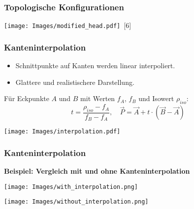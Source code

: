 \documentclass{beamer}
\begin{document}
\begin{frame}[t]
  \frametitle{Topologische Konfigurationen}
  \begin{center}
    \texttt{[image: Images/modified\_head.pdf]}~\scriptsize[6]
  \end{center}
\end{frame}

\begin{frame}[t]
  \frametitle{Kanteninterpolation}
  \begin{itemize}
    \item Schnittpunkte auf Kanten werden linear interpoliert.
    \item Glattere und realistischere Darstellung.
  \end{itemize}
  \vspace{0.5em}

\begin{tcolorbox}[mygraybox]
  Für Eckpunkte $A$ und $B$ mit Werten $f_A$, $f_B$ und Isowert $\rho_{iso}$:
  \[
    t = \frac{\rho_{iso} - f_A}{f_B - f_A}, \quad
    \vec{P} = \vec{A} + t \cdot (\vec{B} - \vec{A})
  \]
\end{tcolorbox}
\noindent
\begin{minipage}{\linewidth}
  \hspace{1cm}\texttt{[image: Images/interpolation.pdf]}
\end{minipage}
\end{frame}

\begin{frame}[t]
  \frametitle{Kanteninterpolation}
  \begin{tcolorbox}[highlightbox]
    \centering\textbf{Beispiel: Vergleich mit und ohne Kanteninterpolation}
  \end{tcolorbox}

  \vspace{0.5em}

  \begin{minipage}{0.48\textwidth}
    \centering
    \texttt{[image: Images/with\_interpolation.png]}
  \end{minipage}
  \hfill
  \begin{minipage}{0.48\textwidth}
    \centering
    \texttt{[image: Images/without\_interpolation.png]}
  \end{minipage}

\end{frame}
\end{document}
